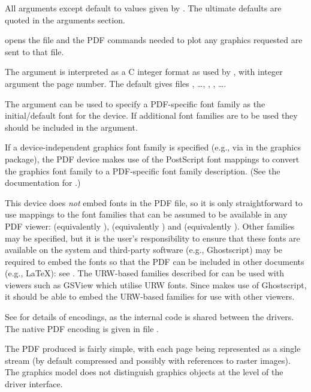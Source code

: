 \begin{Details}\relax
All arguments except  default to values given by
.  The ultimate defaults are quoted in the
arguments section.

 opens the file  and the PDF commands needed to
plot any graphics requested are sent to that file.

The  argument is interpreted as a C integer format as used
by , with integer argument the page number.
The default gives files , \dots, ,
, \dots.

The  argument can be used to specify a PDF-specific
font family as the initial/default font for the device.  If additional
font families are to be used they should be included in the
 argument.

If a device-independent \R{} graphics font family is specified (e.g., via
 in the graphics package), the PDF device makes use
of the PostScript font mappings to convert the \R{} graphics font family
to a PDF-specific font family description.  (See the
documentation for .)

This device does \emph{not} embed fonts in the PDF file, so it is only
straightforward to use mappings to the font families that can be
assumed to be available in any PDF viewer: 
(equivalently ),  (equivalently
) and  (equivalently ).
Other families may be specified, but it is the user's responsibility
to ensure that these fonts are available on the system and third-party
software (e.g., Ghostscript) may be required to embed the fonts so
that the PDF can be included in other documents (e.g., LaTeX): see
.  The URW-based families described for
 can be used with viewers
such as GSView which utilise URW fonts.
Since  makes use of Ghostscript, it should be
able to embed the URW-based families for use with other viewers.

See  for details of encodings, as the internal
code is shared between the drivers.  The native PDF encoding is given
in file .

The PDF produced is fairly simple, with each page being represented as
a single stream (by default compressed and possibly with references to
raster images).  The \R{} graphics model does not distinguish graphics
objects at the level of the driver interface.


\end{Details}
